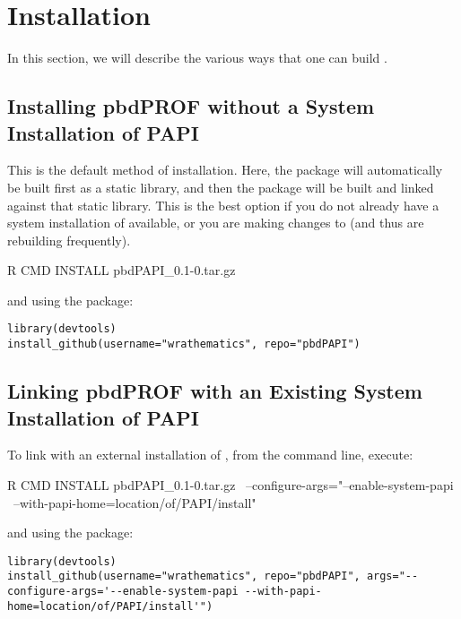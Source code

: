 \section{Installation}
\label{sec:installation}

In this section, we will describe the various ways that one can build \thispackage.



\subsection{Installing pbdPROF without a System Installation of PAPI}

This is the default method of installation.  Here, the \PAPI package will automatically be built first as a static library, and then the \thispackage package will be built and linked against that static library.  This is the best option if you do not already have a system installation of \PAPI available, or you are making changes to \thispackage (and thus are rebuilding frequently).

\begin{Command}
R CMD INSTALL pbdPAPI_0.1-0.tar.gz
\end{Command}
and using the  package:
\begin{lstlisting}
library(devtools)
install_github(username="wrathematics", repo="pbdPAPI")
\end{lstlisting}




\subsection{Linking pbdPROF with an Existing System Installation of PAPI}

To link with an external installation of \PAPI, from the command line, execute:
\begin{Command}
R CMD INSTALL pbdPAPI_0.1-0.tar.gz \ --configure-args="--enable-system-papi \ --with-papi-home=location/of/PAPI/install"
\end{Command}
and using the  package:
\begin{lstlisting}
library(devtools)
install_github(username="wrathematics", repo="pbdPAPI", args="--configure-args='--enable-system-papi --with-papi-home=location/of/PAPI/install'")
\end{lstlisting}
